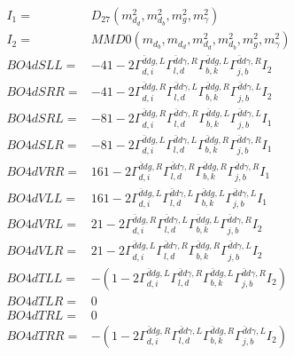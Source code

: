 \documentclass[A4,landscape]{article}
\begin{document}
\begin{align} 
I_1 = & D_{27}(m^2_{d_{{d}}}, m^2_{d_{{b}}}, m^2_{g}, m^2_{\gamma}) \\ 
I_2 = & MMD0(m_{d_{{b}}}, m_{d_{{d}}}, m^2_{d_{{d}}}, m^2_{d_{{b}}}, m^2_{g}, m^2_{\gamma}) \\ 
  BO4dSLL= & -4 1
-
2 \Gamma^{\bar{d}d g ,L}_{d, i} \Gamma^{\bar{d}d \gamma ,R}_{l, d} \Gamma^{\bar{d}d g ,L}_{b, k} \Gamma^{\bar{d}d \gamma ,R}_{j, b} I_2 \\ 
  BO4dSRR= & -4 1
-
2 \Gamma^{\bar{d}d g ,R}_{d, i} \Gamma^{\bar{d}d \gamma ,L}_{l, d} \Gamma^{\bar{d}d g ,R}_{b, k} \Gamma^{\bar{d}d \gamma ,L}_{j, b} I_2 \\ 
  BO4dSRL= & -8 1
-
2 \Gamma^{\bar{d}d g ,R}_{d, i} \Gamma^{\bar{d}d \gamma ,R}_{l, d} \Gamma^{\bar{d}d g ,L}_{b, k} \Gamma^{\bar{d}d \gamma ,L}_{j, b} I_1 \\ 
  BO4dSLR= & -8 1
-
2 \Gamma^{\bar{d}d g ,L}_{d, i} \Gamma^{\bar{d}d \gamma ,L}_{l, d} \Gamma^{\bar{d}d g ,R}_{b, k} \Gamma^{\bar{d}d \gamma ,R}_{j, b} I_1 \\ 
  BO4dVRR= & 16 1
-
2 \Gamma^{\bar{d}d g ,R}_{d, i} \Gamma^{\bar{d}d \gamma ,R}_{l, d} \Gamma^{\bar{d}d g ,R}_{b, k} \Gamma^{\bar{d}d \gamma ,R}_{j, b} I_1 \\ 
  BO4dVLL= & 16 1
-
2 \Gamma^{\bar{d}d g ,L}_{d, i} \Gamma^{\bar{d}d \gamma ,L}_{l, d} \Gamma^{\bar{d}d g ,L}_{b, k} \Gamma^{\bar{d}d \gamma ,L}_{j, b} I_1 \\ 
  BO4dVRL= & 2 1
-
2 \Gamma^{\bar{d}d g ,R}_{d, i} \Gamma^{\bar{d}d \gamma ,L}_{l, d} \Gamma^{\bar{d}d g ,L}_{b, k} \Gamma^{\bar{d}d \gamma ,R}_{j, b} I_2 \\ 
  BO4dVLR= & 2 1
-
2 \Gamma^{\bar{d}d g ,L}_{d, i} \Gamma^{\bar{d}d \gamma ,R}_{l, d} \Gamma^{\bar{d}d g ,R}_{b, k} \Gamma^{\bar{d}d \gamma ,L}_{j, b} I_2 \\ 
  BO4dTLL= & -(1
-
2 \Gamma^{\bar{d}d g ,L}_{d, i} \Gamma^{\bar{d}d \gamma ,R}_{l, d} \Gamma^{\bar{d}d g ,L}_{b, k} \Gamma^{\bar{d}d \gamma ,R}_{j, b} I_2) \\ 
  BO4dTLR= & 0 \\ 
  BO4dTRL= & 0 \\ 
  BO4dTRR= & -(1
-
2 \Gamma^{\bar{d}d g ,R}_{d, i} \Gamma^{\bar{d}d \gamma ,L}_{l, d} \Gamma^{\bar{d}d g ,R}_{b, k} \Gamma^{\bar{d}d \gamma ,L}_{j, b} I_2) \\ 
\end{align} 
\end{document}

